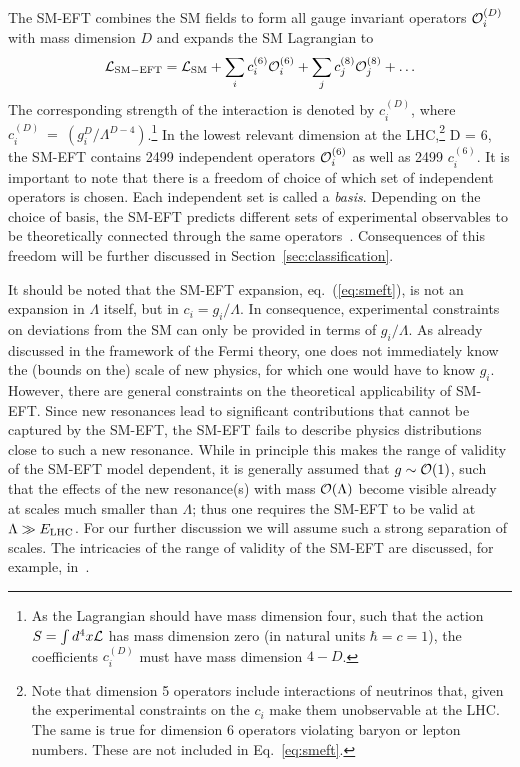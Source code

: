 The SM-EFT combines the SM fields to form all gauge invariant operators
${\cal O}_i^{(D)}$ with mass dimension $D$ and expands the SM
Lagrangian to
\begin{equation}
{\cal L}_{\rm SM-EFT} = {\cal L}_{\rm SM} + \sum_i c_i^{(6)} {\cal O}_i^{(6)} + \sum_j c_j^{(8)} {\cal O}_j^{(8)} + \ldots
\label{eq:smeft}
\end{equation}
The corresponding strength of the interaction is denoted by
$c_i^{(D)}$, where $c_i^{(D)} \ = \ (g_i^D/\Lambda^{D-4})$.\footnote{
  As the Lagrangian should have mass dimension four, such that the
  action $S = \int d^4x {\cal L}$ has mass dimension zero (in natural
  units $\hbar =c =1$), the coefficients $c_i^{(D)}$ must have mass
  dimension $4-D$.}  In the lowest relevant dimension at the LHC,\footnote{Note that 
dimension 5 operators include interactions of neutrinos that, given the experimental constraints
on the $c_i$ make them unobservable at the LHC.
The same is true for dimension 6 operators violating baryon or lepton numbers. 
These are not included in Eq.~\ref{eq:smeft}.}  D = 6, the
SM-EFT contains 2499 independent operators ${\cal O}_i^{(6)}$ as well
as 2499 $c_i^{(6)}$. It is important to note that there is a freedom
of choice of which set of independent operators 
is chosen. Each independent set is called a \emph{basis}. Depending on
the choice of basis, the SM-EFT predicts different sets of 
experimental observables to be theoretically connected through the same
operators~\citep[see, e.g.,][]{Falkowski:2015wza}. Consequences of
this freedom will be further discussed in
Section~\ref{sec:classification}. 

It should be noted
that the SM-EFT expansion, eq.~(\ref{eq:smeft}), is not an expansion in $\Lambda$
itself, but in $c_i=g_i/\Lambda$. 
In consequence, experimental constraints on deviations from the SM can
only be provided in terms of $g_i/\Lambda$.
As already discussed in the framework of the Fermi theory, one
does not immediately know the (bounds on the) scale of new physics, 
for which one would have to know $g_i$.
However, there are general constraints on the theoretical applicability of SM-EFT.
Since new resonances lead to significant contributions that cannot be captured by
the SM-EFT, the SM-EFT fails to describe physics distributions close to such a new resonance.
While in principle this makes the range of validity of the SM-EFT model dependent, 
it is generally assumed that $g \sim {\cal{O}}(1)$, such that the effects of the new 
resonance(s) with mass ${\cal{O}}(\Lambda)$ become visible already at
scales much smaller than $\Lambda$; thus one requires the SM-EFT to be valid at 
$\Lambda\gg E_{\rm LHC}$. 
For our further discussion we will assume such a strong separation of scales.
The intricacies of the range of validity of the SM-EFT are discussed,
for example, in~\cite{Contino:2016jqw}.




